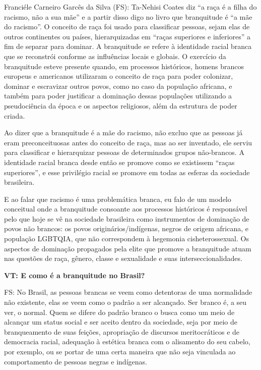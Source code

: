 \documentclass[a4paper,
fontsize=11pt,
oneside,
numbers=noperiodatend,
parskip=half-,
bibliography=totoc,
final
]{scrartcl}
\begin{document}
Franciéle Carneiro Garcês da Silva (FS): Ta-Nehisi Coates diz \enquote{a
raça é a filha do racismo, não a sua mãe} e a partir disso digo no livro
que branquitude é \enquote{a mãe do racismo}. O conceito de raça foi
usado para classificar pessoas, sejam elas de outros continentes ou
países, hierarquizadas em \enquote{raças superiores e inferiores} a fim
de separar para dominar. A branquitude se refere à identidade racial
branca que se reconstrói conforme as influências locais e globais. O
exercício da branquitude esteve presente quando, em processos
históricos, homens brancos europeus e americanos utilizaram o conceito
de raça para poder colonizar, dominar e escravizar outros povos, como no
caso da população africana, e também para poder justificar a dominação
dessas populações utilizando a pseudociência da época e os aspectos
religiosos, além da estrutura de poder criada.

Ao dizer que a branquitude é a mãe do racismo, não excluo que as pessoas
já eram preconceituosas antes do conceito de raça, mas ao ser inventado,
ele serviu para classificar e hierarquizar pessoas de determinados
grupos não-brancos. A identidade racial branca desde então se promove
como se existissem \enquote{raças superiores}, e esse privilégio racial
se promove em todas as esferas da sociedade brasileira.

E ao falar que racismo é uma problemática branca, eu falo de um modelo
conceitual onde a branquitude consoante aos processos históricos é
responsável pelo que hoje se vê na sociedade brasileira como
instrumentos de dominação de povos não brancos: os povos
originários/indígenas, negros de origem africana, e população LGBTQIA,
que não correspondem à hegemonia cisheterossexual. Os aspectos de
dominação propagados pela elite que promove a branquitude atuam nas
questões de raça, gênero, classe e sexualidade e suas
interseccionalidades.

\textbf{VT: E como é a branquitude no Brasil?}

FS: No Brasil, as pessoas brancas se veem como detentoras de uma
normalidade não existente, elas se veem como o padrão a ser alcançado.
Ser branco é, a seu ver, o normal. Quem se difere do padrão branco o
busca como um meio de alcançar um status social e ser aceito dentro da
sociedade, seja por meio de branqueamento de suas feições, apropriação
de discursos meritocráticos e de democracia racial, adequação à estética
branca com o alisamento do seu cabelo, por exemplo, ou se portar de uma
certa maneira que não seja vinculada ao comportamento de pessoas negras
e indígenas.
\end{document}
